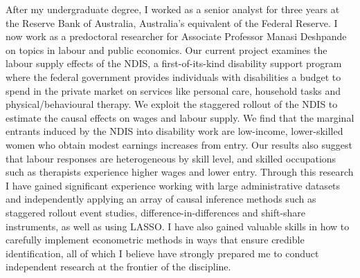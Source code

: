  After my undergraduate degree, I worked as a senior analyst for three years at the Reserve Bank of Australia, Australia's equivalent of the Federal Reserve. I now work as a predoctoral researcher for Associate Professor Manasi Deshpande on topics in labour and public economics. Our current project examines the labour supply effects of the NDIS, a first-of-its-kind disability support program where the federal government provides individuals with disabilities a budget to spend in the private market on services like personal care, household tasks and physical/behavioural therapy. We exploit the staggered rollout of the NDIS to estimate the causal effects on wages and labour supply. We find that the marginal entrants induced by the NDIS into disability work are low-income, lower-skilled women who obtain modest earnings increases from entry. Our results also suggest that labour responses are heterogeneous by skill level, and skilled occupations such as therapists experience higher wages and lower entry. Through this research I have gained significant experience working with large administrative datasets and independently applying an array of causal inference methods such as staggered rollout event studies, difference-in-differences and shift-share instruments, as well as using LASSO. I have also gained valuable skills in how to carefully implement econometric methods in ways that ensure credible identification, all of which I believe have strongly prepared me to conduct independent research at the frontier of the discipline.

